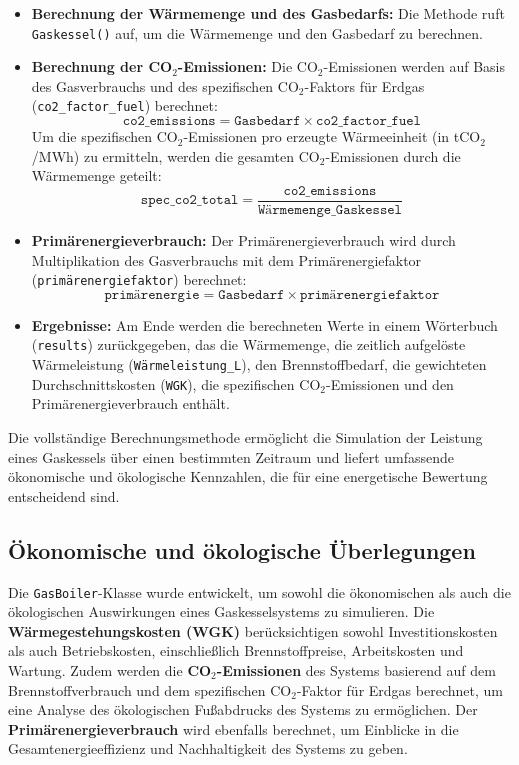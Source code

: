 \begin{itemize}
    \item \textbf{Berechnung der Wärmemenge und des Gasbedarfs:} Die Methode ruft \texttt{Gaskessel()} auf, um die Wärmemenge und den Gasbedarf zu berechnen.
    
    \item \textbf{Berechnung der CO$_2$-Emissionen:} Die CO$_2$-Emissionen werden auf Basis des Gasverbrauchs und des spezifischen CO$_2$-Faktors für Erdgas (\texttt{co2\_factor\_fuel}) berechnet:
    \[
    \texttt{co2\_emissions} = \texttt{Gasbedarf} \times \texttt{co2\_factor\_fuel}
    \]
    Um die spezifischen CO$_2$-Emissionen pro erzeugte Wärmeeinheit (in tCO$_2$/MWh) zu ermitteln, werden die gesamten CO$_2$-Emissionen durch die Wärmemenge geteilt:
    \[
    \texttt{spec\_co2\_total} = \frac{\texttt{co2\_emissions}}{\texttt{Wärmemenge\_Gaskessel}}
    \]
    
    \item \textbf{Primärenergieverbrauch:} Der Primärenergieverbrauch wird durch Multiplikation des Gasverbrauchs mit dem Primärenergiefaktor (\texttt{primärenergiefaktor}) berechnet:
    \[
    \texttt{primärenergie} = \texttt{Gasbedarf} \times \texttt{primärenergiefaktor}
    \]
    
    \item \textbf{Ergebnisse:} Am Ende werden die berechneten Werte in einem Wörterbuch (\texttt{results}) zurückgegeben, das die Wärmemenge, die zeitlich aufgelöste Wärmeleistung (\texttt{Wärmeleistung\_L}), den Brennstoffbedarf, die gewichteten Durchschnittskosten (\texttt{WGK}), die spezifischen CO$_2$-Emissionen und den Primärenergieverbrauch enthält.
\end{itemize}

Die vollständige Berechnungsmethode ermöglicht die Simulation der Leistung eines Gaskessels über einen bestimmten Zeitraum und liefert umfassende ökonomische und ökologische Kennzahlen, die für eine energetische Bewertung entscheidend sind.

\subsection{Ökonomische und ökologische Überlegungen}
Die \texttt{GasBoiler}-Klasse wurde entwickelt, um sowohl die ökonomischen als auch die ökologischen Auswirkungen eines Gaskesselsystems zu simulieren. Die \textbf{Wärmegestehungskosten (WGK)} berücksichtigen sowohl Investitionskosten als auch Betriebskosten, einschließlich Brennstoffpreise, Arbeitskosten und Wartung. Zudem werden die \textbf{CO$_2$-Emissionen} des Systems basierend auf dem Brennstoffverbrauch und dem spezifischen CO$_2$-Faktor für Erdgas berechnet, um eine Analyse des ökologischen Fußabdrucks des Systems zu ermöglichen. Der \textbf{Primärenergieverbrauch} wird ebenfalls berechnet, um Einblicke in die Gesamtenergieeffizienz und Nachhaltigkeit des Systems zu geben.

